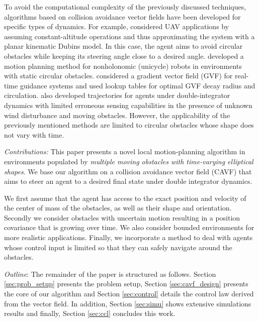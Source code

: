 To avoid the computational complexity of the previously discussed techniques, algorithms based on collision avoidance vector fields have been developed for specific types of dynamics. For example, \cite{marchidan2020collision} considered UAV applications by assuming constant-altitude operations and thus approximating the system with a planar kinematic Dubins model. In this case, the agent aims to avoid circular obstacles while keeping its steering angle close to a desired angle. \cite{panagou2014motion, panagou2016distributed} developed a motion planning method for nonholonomic (unicycle) robots in environments with static circular obstacles.
\cite{wilhelm2019vector} considered a gradient vector field (GVF) for real-time guidance systems and used lookup tables for optimal GVF decay radius and circulation. \cite{garg2019finite} also developed trajectories for agents under double-integrator dynamics with limited erroneous sensing capabilities in the presence of unknown wind disturbance and moving obstacles. However, the applicability of the previously mentioned methods are limited to circular obstacles whose shape does not vary with time. 

\textit{Contributions:} This paper presents a novel local motion-planning algorithm in environments populated by \textit{multiple moving obstacles with time-varying elliptical shapes}. We base our algorithm on a collision avoidance vector field (CAVF) that aims to steer an agent to a desired final state under double integrator dynamics.

We first assume that the agent has access to the exact position and velocity of the center of mass of the obstacles, as well as their shape and orientation. Secondly we consider obstacles with uncertain motion resulting in a position covariance that is growing over time. We also consider bounded environments for more realistic applications. Finally, we incorporate a method to deal with agents whose control input is limited so that they can safely navigate around the obstacles.


\textit{Outline}: The remainder of the paper is structured as follows. Section \ref{sec:prob_setup} presents the problem setup, Section \ref{sec:cavf_design} presents the core of our algorithm and Section \ref{sec:control} details the control law derived from the vector field. In addition, Section \ref{sec:simu} shows extensive simulations results and finally, Section \ref{sec:ccl} concludes this work.

